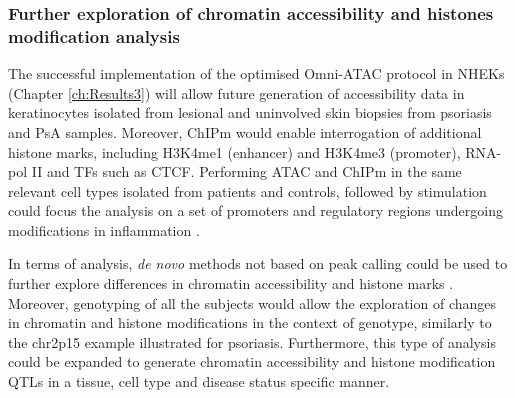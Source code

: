 


\subsubsection{Further exploration of chromatin accessibility and histones modification analysis}
The successful implementation of the optimised Omni-ATAC protocol in NHEKs (Chapter \ref{ch:Results3}) will allow future generation of accessibility data in keratinocytes isolated from lesional and uninvolved skin biopsies from psoriasis and PsA samples. Moreover, ChIPm would enable interrogation of additional histone marks, including H3K4me1 (enhancer) and H3K4me3 (promoter), RNA-pol II and TFs such as CTCF. Performing ATAC and ChIPm in the same relevant cell types isolated from patients and controls, followed by stimulation could focus the analysis on a set of promoters and regulatory regions undergoing modifications in inflammation \parencite{Peeters2015}. %

In terms of analysis, \textit{de novo} methods not based on peak calling could be used to further explore differences in chromatin accessibility and histone marks \parencite{Shen2013}. Moreover, genotyping of all the subjects would allow the exploration of changes in chromatin and histone modifications in the context of genotype, %
similarly to the chr2p15 example illustrated for psoriasis. Furthermore, this type of analysis could be expanded to generate chromatin accessibility and histone modification QTLs in a tissue, cell type and disease status specific manner.

